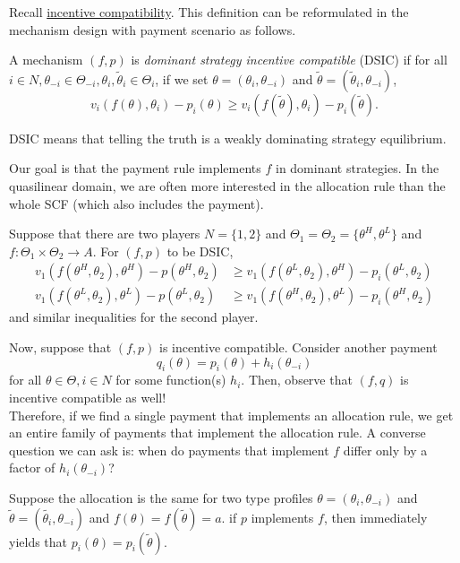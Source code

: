 		Recall \hyperref[def: dsic]{incentive compatibility}. This definition can be reformulated in the mechanism design with payment scenario as follows.

		\begin{fdef}
			\label{def: payment dsic}
			A mechanism $(f,p)$ is \emph{dominant strategy incentive compatible} (DSIC) if for all $i \in N, \theta_{-i} \in \Theta_{-i}, \theta_i,\widetilde{\theta}_i \in \Theta_i$, if we set $\theta = (\theta_i,\theta_{-i})$ and $\widetilde{\theta} = (\widetilde{\theta}_i,\theta_{-i})$,
			\[ v_i(f(\theta),\theta_i) - p_i(\theta) \ge v_i(f(\widetilde{\theta}),\theta_i) - p_i(\widetilde{\theta}). \]
		\end{fdef}

		DSIC means that telling the truth is a weakly dominating strategy equilibrium.

		Our goal is that the payment rule implements $f$ in dominant strategies. In the quasilinear domain, we are often more interested in the allocation rule than the whole SCF (which also includes the payment).
		
		\begin{fex}
			Suppose that there are two players $N = \{1,2\}$ and $\Theta_1 = \Theta_2 = \{\theta^H, \theta^L\}$ and $f : \Theta_1 \times \Theta_2 \to A$. For $(f,p)$ to be DSIC,
			\begin{align*}
				v_1( f(\theta^H, \theta_2) , \theta^H ) - p(\theta^H,\theta_2) &\ge v_1(f(\theta^L,\theta_2) , \theta^H) - p_i(\theta^L,\theta_2) \\
				v_1( f(\theta^L, \theta_2) , \theta^L ) - p(\theta^L,\theta_2) &\ge v_1(f(\theta^H,\theta_2) , \theta^L) - p_i(\theta^H,\theta_2)
			\end{align*}
			and similar inequalities for the second player. 
		\end{fex}

		Now, suppose that $(f,p)$ is incentive compatible. Consider another payment
		\[ q_i(\theta) = p_i(\theta) + h_i(\theta_{-i}) \]
		for all $\theta \in \Theta,i \in N$ for some function(s) $h_i$. Then, observe that $(f,q)$ is incentive compatible as well!\\
		Therefore, if we find a single payment that implements an allocation rule, we get an entire family of payments that implement the allocation rule. A converse question we can ask is: when do payments that implement $f$ differ only by a factor of $h_i(\theta_{-i})$?

		\begin{fex}
			Suppose the allocation is the same for two type profiles $\theta = (\theta_i,\theta_{-i})$ and $\widetilde{\theta} = (\widetilde{\theta_i},\theta_{-i})$ and $f(\theta) = f(\widetilde{\theta}) = a$. if $p$ implements $f$, then  immediately yields that $p_i(\theta) = p_i(\widetilde{\theta})$.
		\end{fex}

